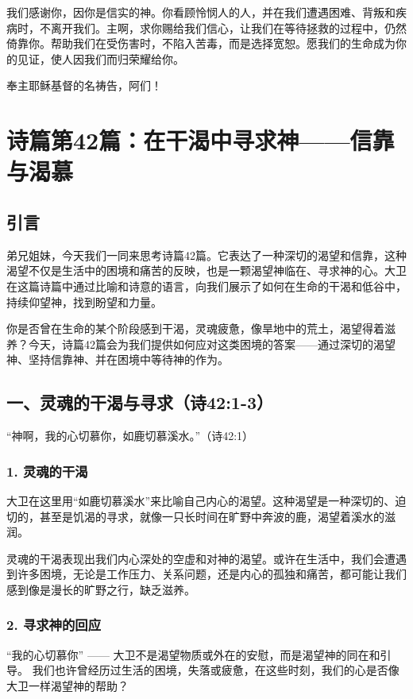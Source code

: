 \documentclass[a4paper, 12pt]{article}
\begin{document}
我们感谢你，因你是信实的神。你看顾怜悯人的人，并在我们遭遇困难、背叛和疾病时，不离开我们。主啊，求你赐给我们信心，让我们在等待拯救的过程中，仍然倚靠你。帮助我们在受伤害时，不陷入苦毒，而是选择宽恕。愿我们的生命成为你的见证，使人因我们而归荣耀给你。

奉主耶稣基督的名祷告，阿们！
\newpage
\section{诗篇第42篇：在干渴中寻求神——信靠与渴慕}
\subsection*{引言}
\hspace{0.6cm}弟兄姐妹，今天我们一同来思考诗篇42篇。它表达了一种深切的渴望和信靠，这种渴望不仅是生活中的困境和痛苦的反映，也是一颗渴望神临在、寻求神的心。大卫在这篇诗篇中通过比喻和诗意的语言，向我们展示了如何在生命的干渴和低谷中，持续仰望神，找到盼望和力量。

你是否曾在生命的某个阶段感到干渴，灵魂疲惫，像旱地中的荒土，渴望得着滋养？今天，诗篇42篇会为我们提供如何应对这类困境的答案——通过深切的渴望神、坚持信靠神、并在困境中等待神的作为。
\subsection*{一、灵魂的干渴与寻求（诗42:1-3）}
“神啊，我的心切慕你，如鹿切慕溪水。”（诗42:1）

\subsubsection*{1. 灵魂的干渴}
\hspace{0.6cm}大卫在这里用“如鹿切慕溪水”来比喻自己内心的渴望。这种渴望是一种深切的、迫切的，甚至是饥渴的寻求，就像一只长时间在旷野中奔波的鹿，渴望着溪水的滋润。

灵魂的干渴表现出我们内心深处的空虚和对神的渴望。或许在生活中，我们会遭遇到许多困境，无论是工作压力、关系问题，还是内心的孤独和痛苦，都可能让我们感到像是漫长的旷野之行，缺乏滋养。
\subsubsection*{2. 寻求神的回应}
\hspace{0.6cm}“我的心切慕你” —— 大卫不是渴望物质或外在的安慰，而是渴望神的同在和引导。
我们也许曾经历过生活的困境，失落或疲惫，在这些时刻，我们的心是否像大卫一样渴望神的帮助？
\end{document}
